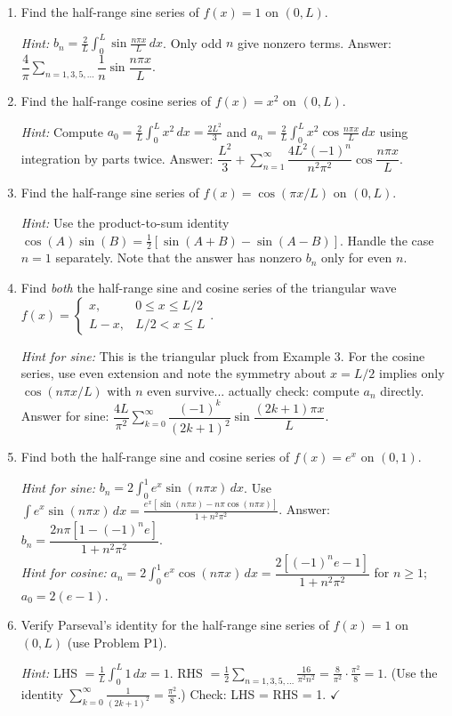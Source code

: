 \documentclass[12pt,a4paper]{article}
\begin{document}
\begin{enumerate}[leftmargin=*, label=\textbf{P\arabic*.}]

\item Find the half-range sine series of $f(x) = 1$ on $(0,L)$.

\textit{Hint:} $b_n = \frac{2}{L}\int_0^L \sin\frac{n\pi x}{L}\,dx$. Only odd $n$ give nonzero terms. Answer: $\dfrac{4}{\pi}\sum_{n=1,3,5,\ldots}\dfrac{1}{n}\sin\dfrac{n\pi x}{L}$.

\item Find the half-range cosine series of $f(x) = x^2$ on $(0,L)$.

\textit{Hint:} Compute $a_0 = \frac{2}{L}\int_0^L x^2\,dx = \frac{2L^2}{3}$ and $a_n = \frac{2}{L}\int_0^L x^2\cos\frac{n\pi x}{L}\,dx$ using integration by parts twice. Answer: $\dfrac{L^2}{3} + \sum_{n=1}^{\infty}\dfrac{4L^2(-1)^n}{n^2\pi^2}\cos\dfrac{n\pi x}{L}$.

\item Find the half-range sine series of $f(x) = \cos(\pi x/L)$ on $(0,L)$.

\textit{Hint:} Use the product-to-sum identity $\cos(A)\sin(B) = \frac{1}{2}[\sin(A+B)-\sin(A-B)]$. Handle the case $n=1$ separately. Note that the answer has nonzero $b_n$ only for even $n$.

\item Find \emph{both} the half-range sine and cosine series of the triangular wave $f(x)=\begin{cases}x, & 0\leq x\leq L/2\\ L-x, & L/2<x\leq L\end{cases}$.

\textit{Hint for sine:} This is the triangular pluck from Example 3. For the cosine series, use even extension and note the symmetry about $x=L/2$ implies only $\cos(n\pi x/L)$ with $n$ even survive... actually check: compute $a_n$ directly. Answer for sine: $\dfrac{4L}{\pi^2}\displaystyle\sum_{k=0}^{\infty}\dfrac{(-1)^k}{(2k+1)^2}\sin\dfrac{(2k+1)\pi x}{L}$.

\item Find both the half-range sine and cosine series of $f(x) = e^x$ on $(0,1)$.

\textit{Hint for sine:} $b_n = 2\int_0^1 e^x\sin(n\pi x)\,dx$. Use $\int e^x\sin(n\pi x)\,dx = \frac{e^x[\sin(n\pi x)-n\pi\cos(n\pi x)]}{1+n^2\pi^2}$. Answer: $b_n = \dfrac{2n\pi[1-(-1)^n e]}{1+n^2\pi^2}$.\\
\textit{Hint for cosine:} $a_n = 2\int_0^1 e^x\cos(n\pi x)\,dx = \dfrac{2[(-1)^n e - 1]}{1+n^2\pi^2}$ for $n\geq1$; $a_0 = 2(e-1)$.

\item Verify Parseval's identity for the half-range sine series of $f(x)=1$ on $(0,L)$ (use Problem P1).

\textit{Hint:} LHS $= \frac{1}{L}\int_0^L 1\,dx = 1$. RHS $= \frac{1}{2}\sum_{n=1,3,5,\ldots}\frac{16}{\pi^2 n^2} = \frac{8}{\pi^2}\cdot\frac{\pi^2}{8} = 1$. (Use the identity $\sum_{k=0}^{\infty}\frac{1}{(2k+1)^2} = \frac{\pi^2}{8}$.) Check: LHS = RHS = 1. $\checkmark$

\end{enumerate}
\end{document}
